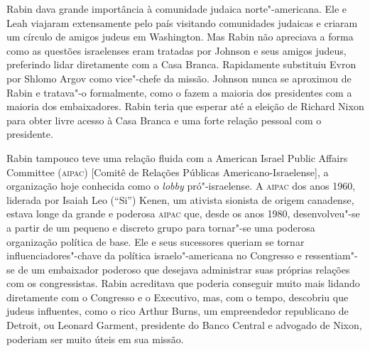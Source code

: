 

Rabin dava grande importância à comunidade judaica norte"-americana. Ele
e Leah viajaram extensamente pelo país visitando comunidades judaicas e
criaram um círculo de amigos judeus em Washington. Mas Rabin não
apreciava a forma como as questões israelenses eram tratadas por Johnson
e seus amigos judeus, preferindo lidar diretamente com a Casa Branca.
Rapidamente substituiu Evron por Shlomo Argov como vice"-chefe da missão.
Johnson nunca se aproximou de Rabin e tratava"-o formalmente, como o
fazem a maioria dos presidentes com a maioria dos embaixadores. Rabin
teria que esperar até a eleição de Richard Nixon para obter livre acesso
à Casa Branca e uma forte relação pessoal com o presidente.

Rabin tampouco teve uma relação fluida com a American Israel Public
Affairs Committee (\textsc{aipac}) {[}Comitê de Relações Públicas Americano-Israelense{]}, a organização hoje conhecida como o \textit{lobby}
pró"-israelense. A \textsc{aipac} dos anos 1960, liderada por Isaiah Leo (``Si'')
Kenen, um ativista sionista de origem canadense, estava longe da grande
e poderosa \textsc{aipac} que, desde os anos 1980, desenvolveu"-se a partir de um
pequeno e discreto grupo para tornar"-se uma poderosa organização
política de base. Ele e seus sucessores queriam se tornar
influenciadores"-chave da política israelo"-americana no Congresso e
ressentiam"-se de um embaixador poderoso que desejava administrar suas
próprias relações com os congressistas. Rabin acreditava que poderia
conseguir muito mais lidando diretamente com o Congresso e o Executivo,
mas, com o tempo, descobriu que judeus influentes, como o rico Arthur Burns,
um empreendedor republicano de Detroit, ou Leonard Garment, presidente do Banco
Central e advogado de Nixon, poderiam ser muito úteis
em sua missão.

